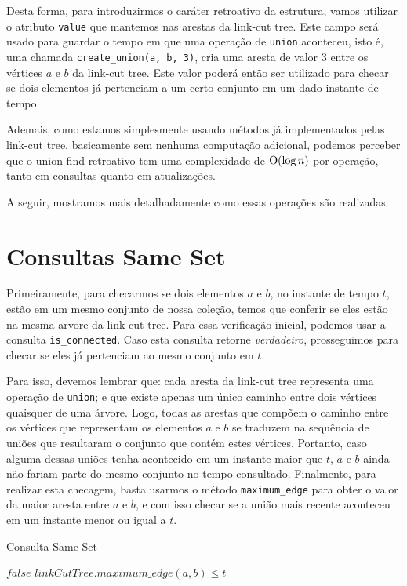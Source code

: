 Desta forma, para introduzirmos o caráter retroativo da estrutura, vamos utilizar o atributo \texttt{value} que mantemos nas arestas da link-cut tree. Este campo será usado para guardar o tempo em que uma operação de \texttt{union} aconteceu, isto é, uma chamada \texttt{create\_union(a, b, 3)}, cria uma aresta de valor $3$ entre os vértices $a$ e $b$ da link-cut tree. Este valor poderá então ser utilizado para checar se dois elementos já pertenciam a um certo conjunto em um dado instante de tempo.

Ademais, como estamos simplesmente usando métodos já implementados pelas link-cut tree, basicamente sem nenhuma computação adicional, podemos perceber que o union-find retroativo tem uma complexidade de $\mathrm{O}(\log n)$ por operação, tanto em consultas quanto em atualizações.

A seguir, mostramos mais detalhadamente como essas operações são realizadas.

\section{Consultas Same Set}
\label{sec:uf-same-set}

Primeiramente, para checarmos se dois elementos $a$ e $b$, no instante de tempo $t$, estão em um mesmo conjunto de nossa coleção, temos que conferir se eles estão na mesma arvore da link-cut tree. Para essa verificação inicial, podemos usar a consulta \texttt{is\_connected}. Caso esta consulta retorne \emph{verdadeiro}, prosseguimos para checar se eles já pertenciam ao mesmo conjunto em $t$.

Para isso, devemos lembrar que: cada aresta da link-cut tree representa uma operação de \texttt{union}; e que existe apenas um único caminho entre dois vértices quaisquer de uma árvore. Logo, todas as arestas que compõem o caminho entre os vértices que representam os elementos $a$ e $b$ se traduzem na sequência de uniões que resultaram o conjunto que contém estes vértices. Portanto, caso alguma dessas uniões tenha acontecido em um instante maior que $t$, $a$ e $b$ ainda não fariam parte do mesmo conjunto no tempo consultado. Finalmente, para realizar esta checagem, basta usarmos o método \texttt{maximum\_edge} para obter o valor da maior aresta entre $a$ e $b$, e com isso checar se a união mais recente aconteceu em um instante menor ou igual a $t$.

\begin{algorithm}[h!]
    \caption{Consulta Same Set}\label{uf:same-set}
    \begin{algorithmic}
        \State \Return $false$
        \EndIf
        \State \Return $linkCutTree.maximum\_edge(a, b) \leq t$
        \EndFunction
    \end{algorithmic}
\end{algorithm}

